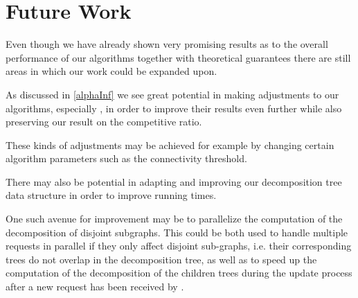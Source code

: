 \documentclass[a4paper, 10pt]{article}
\newcommand{\crep}{\text{C{\scriptsize REP}}}
\newcommand{\coreDel}{\text{C{\scriptsize REP}-C{\scriptsize ORE}}}
\theoremstyle{definition}
\begin{document}
\section{Future Work}
\label{future_work_section}

Even though we have already shown very promising results as to the overall performance of our algorithms together with theoretical guarantees there are still areas in which our work could be expanded upon.

As discussed in \cref{alphaInf} we see great potential in making adjustments to our algorithms, especially \coreDel{}, in order to improve their results even further while also preserving our result on the competitive ratio.

These kinds of adjustments may be achieved for example by changing certain algorithm parameters such as the connectivity threshold.

There may also be potential in adapting and improving our decomposition tree data structure in order to improve running times.

One such avenue for improvement may be to parallelize the computation of the decomposition of disjoint subgraphs. This could be both used to handle multiple requests in parallel if they only affect disjoint sub-graphs, i.e. their corresponding trees do not overlap in the decomposition tree, as well as to speed up the computation of the decomposition of the children trees during the update process after a new request has been received by \crep{}.


\clearpage %

                             

	
\end{document}
